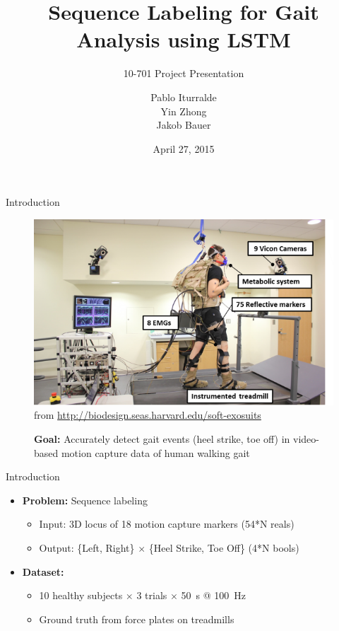 \documentclass{beamer}
\title
{
    Sequence Labeling for Gait Analysis using LSTM
}
\subtitle
{
    10-701
    Project Presentation
}
\author
{
    Pablo Iturralde\\
    Yin Zhong\\
    Jakob Bauer
}
\date
{
    April 27, 2015
}
\begin{document}
\begin{frame}
  \titlepage
\end{frame}

\begin{frame}{Introduction}
    \begin{figure}[H]
        \begin{center}
        \includegraphics[height=.6\textheight]{figures/treadmill.png} \\
        \tiny from \url{http://biodesign.seas.harvard.edu/soft-exosuits}

        \small \textbf{Goal:}  Accurately detect gait events (heel strike, toe off) in video-based motion capture data of human walking gait
        \end{center}
    \end{figure}
\end{frame}

\begin{frame}{Introduction}
    \begin{itemize}
        \item \textbf{Problem:} Sequence labeling
        \begin{itemize}
            \item Input: 3D locus of 18 motion capture markers (54*N reals)
            \item Output: \{Left, Right\} $\times$ \{Heel Strike, Toe Off\} (4*N bools)
        \end{itemize}
        \item \textbf{Dataset:}
        \begin{itemize}
            \item 10 healthy subjects $\times$ 3 trials $\times$ \SI{50}{\second} @ \SI{100}{\Hz}
            \item Ground truth from force plates on treadmills
        \end{itemize}
    \end{itemize}
\end{frame}
\end{document}
